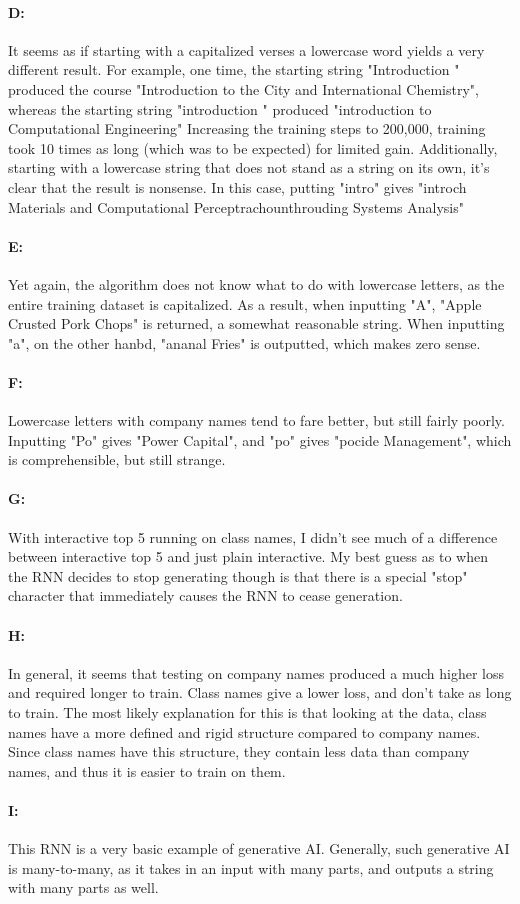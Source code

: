 \documentclass{article}
\begin{document}
\paragraph{D: } It seems as if starting with a capitalized verses a lowercase word yields a very different result. For example, one time, the starting string "Introduction " produced the course "Introduction to the City and International Chemistry", whereas the starting string "introduction " produced "introduction to Computational Engineering" \newline
Increasing the training steps to 200,000, training took 10 times as long (which was to be expected) for limited gain. Additionally, starting with a lowercase string that does not stand as a string on its own, it's clear that the result is nonsense. In this case, putting "intro" gives "introch Materials and Computational Perceptrachounthrouding Systems Analysis"

\paragraph{E: } Yet again, the algorithm does not know what to do with lowercase letters, as the entire training dataset is capitalized. As a result, when inputting "A", "Apple Crusted Pork Chops" is returned, a somewhat reasonable string. When inputting "a", on the other hanbd, "ananal Fries" is outputted, which makes zero sense.

\paragraph{F: } Lowercase letters with company names tend to fare better, but still fairly poorly. Inputting "Po" gives "Power Capital", and "po" gives "pocide Management", which is comprehensible, but still strange.

\paragraph{G: } With interactive top 5 running on class names, I didn't see much of a difference between interactive top 5 and just plain interactive. My best guess as to when the RNN decides to stop generating though is that there is a special "stop" character that immediately causes the RNN to cease generation.

\paragraph{H: } In general, it seems that testing on company names produced a much higher loss and required longer to train. Class names give a lower loss, and don't take as long to train. The most likely explanation for this is that looking at the data, class names have a more defined and rigid structure compared to company names. Since class names have this structure, they contain less data than company names, and thus it is easier to train on them.

\paragraph{I: } This RNN is a very basic example of generative AI. Generally, such generative AI is many-to-many, as it takes in an input with many parts, and outputs a string with many parts as well.
\end{document}
